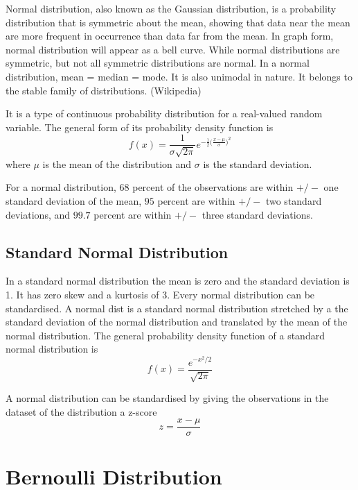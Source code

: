 \documentclass[14pt, a4paper]{article}
\theoremstyle{definition}
\begin{document}
  
  
Normal distribution, also known as the Gaussian distribution, is a probability distribution that is symmetric about the mean, showing that data near the mean are more frequent in occurrence than data far from the mean. In graph form, normal distribution will appear as a bell curve. While normal distributions are symmetric, but not all symmetric distributions are normal. In a normal distribution, mean = median = mode. It is also unimodal in nature. It belongs to the stable family of distributions. (Wikipedia)

It is a type of continuous probability distribution for a real-valued random variable. The general form of its probability density function is 
\[ f(x) = \frac{1}{\sigma \sqrt{2 \pi } } e^{ - \frac{1}{2} \big( \frac{x-\mu}{\sigma} \big) ^2 }  \]
where $\mu$ is the mean of the distribution and $\sigma$ is the standard deviation.

For a normal distribution, $68$ percent of the observations are within $+/-$ one standard deviation of the mean, $95$ percent are within $+/-$ two standard deviations, and $99.7$ percent are within $+/-$ three standard deviations.


\subsection{Standard Normal Distribution}
In a standard normal distribution the mean is zero and the standard deviation is 1. It has zero skew and a kurtosis of 3. Every normal distribution can be standardised. A normal dist is a standard normal distribution stretched by a the standard deviation of the normal distribution and translated by the mean of the normal distribution. The general probability density function of a standard normal distribution is 
\[ f(x) = \frac{e^{-x^2 / 2}}{\sqrt{2 \pi} } \]

A normal distribution can be standardised by giving the observations in the dataset of the distribution a z-score 
\[ z = \frac{x - \mu}{\sigma}\]

\section{Bernoulli Distribution}
\end{document}
